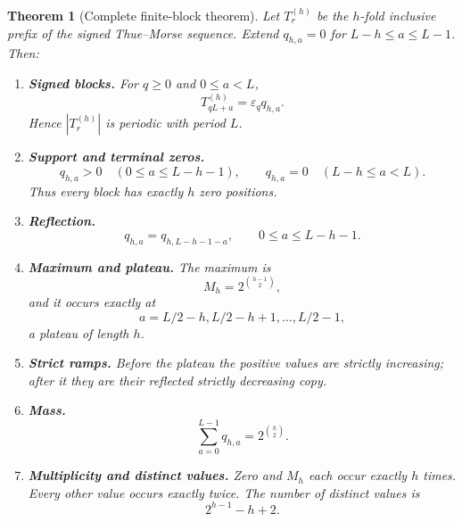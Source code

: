 \documentclass[11pt,oneside]{article}
\numberwithin{equation}{section}
\newtheorem{theorem}{Theorem}[section]
\theoremstyle{definition}
\theoremstyle{remark}
\newcommand{\eps}{\varepsilon}
\newcommand{\Prefix}{T}
\begin{document}
\begin{theorem}[Complete finite-block theorem]
Let \(\Prefix_r^{(h)}\) be the \(h\)-fold inclusive prefix of the signed
Thue--Morse sequence.  Extend \(q_{h,a}=0\) for
\(L-h\le a\le L-1\).  Then:

\begin{enumerate}
\item \textbf{Signed blocks.}  For \(q\ge0\) and \(0\le a<L\),
\begin{equation}
 \boxed{\Prefix_{qL+a}^{(h)}=\eps_q q_{h,a}.}
 \label{eq:general-signed-block}
\end{equation}
Hence \(|\Prefix_r^{(h)}|\) is periodic with period \(L\).

\item \textbf{Support and terminal zeros.}
\begin{equation}
 q_{h,a}>0\quad(0\le a\le L-h-1),
 \qquad
 q_{h,a}=0\quad(L-h\le a<L).
 \label{eq:general-support}
\end{equation}
Thus every block has exactly \(h\) zero positions.

\item \textbf{Reflection.}
\begin{equation}
 q_{h,a}=q_{h,L-h-1-a},
 \qquad 0\le a\le L-h-1.
 \label{eq:general-reflection}
\end{equation}

\item \textbf{Maximum and plateau.}  The maximum is
\begin{equation}
 M_h=2^{\binom{h-1}{2}},
 \label{eq:general-maximum}
\end{equation}
and it occurs exactly at
\begin{equation}
 a=L/2-h,L/2-h+1,\ldots,L/2-1,
 \label{eq:general-plateau}
\end{equation}
a plateau of length \(h\).

\item \textbf{Strict ramps.}  Before the plateau the positive values are
strictly increasing; after it they are their reflected strictly decreasing
copy.

\item \textbf{Mass.}
\begin{equation}
 \sum_{a=0}^{L-1}q_{h,a}=2^{\binom h2}.
 \label{eq:general-mass}
\end{equation}

\item \textbf{Multiplicity and distinct values.}  Zero and \(M_h\) each
occur exactly \(h\) times.  Every other value occurs exactly twice.  The
number of distinct values is
\begin{equation}
 \boxed{2^{h-1}-h+2.}
 \label{eq:general-distinct}
\end{equation}


\end{enumerate}
\end{theorem}
\end{document}
